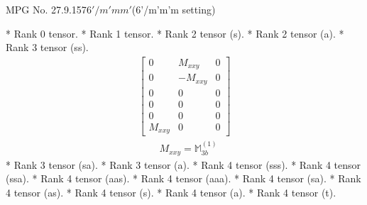 \documentclass[fleqn,8pt,landscape]{jsarticle}
\begin{document}
\setcounter{MaxMatrixCols}{32}

\renewcommand{\tablename}{Table~}
\renewcommand{\figurename}{Figure~}
\begin{center}
\LARGE
MPG No. 27.9.157\quad$6'/m'mm'$\quad(6'/m'm'm setting)
\end{center}
* Rank 0 tensor.
* Rank 1 tensor.
* Rank 2 tensor (s).
* Rank 2 tensor (a).
* Rank 3 tensor (ss).
\begin{align*}
\begin{bmatrix} 0 & M_{xxy} & 0 \\ 0 & - M_{xxy} & 0 \\ 0 & 0 & 0 \\ 0 & 0 & 0 \\ 0 & 0 & 0 \\ M_{xxy} & 0 & 0 \end{bmatrix}
\end{align*}
\begin{align*}
& M_{xxy} = \mathbb{M}_{3b}^{(1)}
\end{align*}
* Rank 3 tensor (sa).
* Rank 3 tensor (a).
* Rank 4 tensor (sss).
* Rank 4 tensor (ssa).
* Rank 4 tensor (aas).
* Rank 4 tensor (aaa).
* Rank 4 tensor (sa).
* Rank 4 tensor (as).
* Rank 4 tensor (s).
* Rank 4 tensor (a).
* Rank 4 tensor (t).
\end{document}
